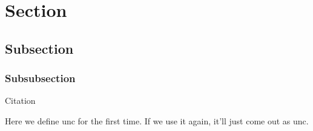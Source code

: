 \section{Section}
\subsection{Subsection}
\subsubsection{Subsubsection}
Citation \cite{einstein,knuthwebsite}

Here we define \gls{unc} for the first time. If we use it again, it'll just come out as \gls{unc}.